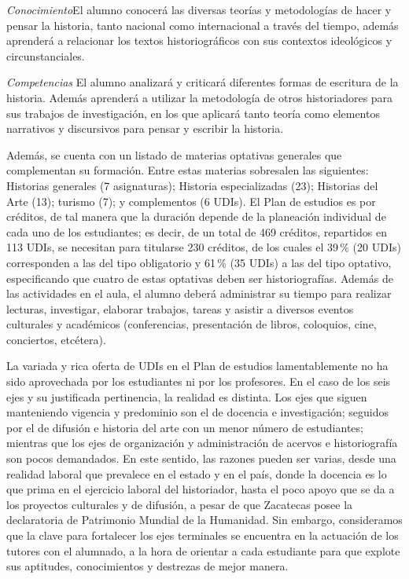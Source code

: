 \begin{scriptsize}
\begin{framed}
\textit{Conocimiento}\quad El 
alumno conocerá las diversas teorías y metodologías de hacer y pensar 
la historia, tanto nacional como internacional a través del tiempo, 
además aprenderá a relacionar los textos historiográficos con sus 
contextos ideológicos y circunstanciales.  

\textit{Competencias }\quad El alumno analizará y criticará diferentes 
formas de escritura de la historia. Además aprenderá a utilizar la 
metodología de otros historiadores para sus trabajos de investigación, 
en los que aplicará tanto teoría como elementos narrativos y 
discursivos para pensar y escribir la historia.
\end{framed}
\end{scriptsize}

\smallskip
Además, se cuenta con un listado de materias optativas generales que 
complementan su formación. Entre estas materias sobresalen las siguientes: 
Historias generales (7 asignaturas); Historia especializadas (23); Historias 
del Arte (13); turismo (7); y complementos (6 UDIs). El 
Plan de estudios es por créditos, de tal manera que la duración depende de la 
planeación individual de cada uno de los estudiantes; es decir, de un 
total de 469 créditos, repartidos en 113 UDIs, se necesitan para 
titularse 230 créditos, de los cuales el 39\,\% (20 UDIs) corresponden a 
las del tipo obligatorio y  61\,\% (35 UDIs) a las del tipo optativo, 
especificando que cuatro de estas optativas deben ser historiografías. 
Además de las actividades en el aula, el alumno deberá administrar su 
tiempo para realizar lecturas, investigar, elaborar trabajos, tareas y 
asistir a diversos eventos culturales y académicos (conferencias, 
presentación de libros, coloquios, cine, conciertos, etcétera).  

\enlargethispage{1\baselineskip}
La variada y rica oferta de UDIs en el Plan de estudios 
lamentablemente no ha sido aprovechada por los estudiantes ni por los 
profesores. En el caso de los seis ejes y su justificada pertinencia, 
la realidad es distinta. Los ejes que siguen manteniendo vigencia y 
predominio son el de docencia e investigación; seguidos por el de 
difusión e  historia del arte con un menor número de estudiantes; mientras 
que los ejes de  organización y administración de acervos e 
historiografía son pocos demandados. En este sentido, las razones 
pueden ser varias, desde una realidad laboral que prevalece en el 
estado y en el país, donde la docencia es lo que prima en el ejercicio 
laboral del historiador, hasta el poco apoyo que se da a los proyectos 
culturales y de difusión, a pesar de que Zacatecas posee la 
declaratoria de Patrimonio Mundial de la Humanidad. Sin embargo, 
consideramos que la clave para fortalecer los ejes terminales se 
encuentra en la actuación de los tutores con el alumnado, a la hora de 
orientar a cada  estudiante para que explote sus aptitudes, 
conocimientos y destrezas de mejor manera. 

